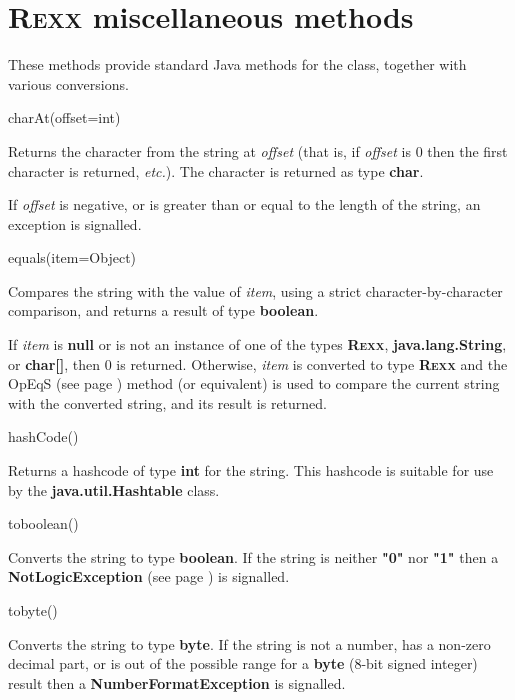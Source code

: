 \section{R\textsc{exx} miscellaneous methods}\label{refrexxmis}
 These methods provide standard Java methods for the class, together with
various conversions.
\begin{description}
\item{charAt(offset=int)}

Returns the character from the string at \emph{offset} (that is, if
\emph{offset} is 0 then the first character is returned, \emph{etc.}).
The character is returned as type \textbf{char}.
 
If \emph{offset} is negative, or is greater than or equal to the
length of the string, an exception is signalled.
\item{equals(item=Object)}

Compares the string with the value of \emph{item}, using a strict
character-by-character comparison, and returns a result of
type \textbf{boolean}.
 
If \emph{item} is \textbf{null} or is not an instance of one of
the types \textbf{R\textsc{exx}}, \textbf{java.lang.String}, or \textbf{char[]},
then 0 is returned.
Otherwise, \emph{item} is converted to type \textbf{R\textsc{exx}} and the
 OpEqS (see page \pageref{refopeqs})  method (or equivalent) is used to compare the
current string with the converted string, and its result is returned.
\item{hashCode()}

Returns a hashcode of type \textbf{int} for the string.
This hashcode is suitable for use by the \textbf{java.util.Hashtable}
class.
\item{toboolean()}

Converts the string to type \textbf{boolean}.  If the string is
neither \textbf{"0"} nor \textbf{"1"} then
a  \textbf{NotLogicException} (see page \pageref{refexpnle})  is signalled.
\item{tobyte()}

Converts the string to type \textbf{byte}.  If the string is
not a number, has a non-zero decimal part, or is out of the possible
range for a \textbf{byte} (8-bit signed integer) result then
a \textbf{NumberFormatException} is signalled.


\end{description}
